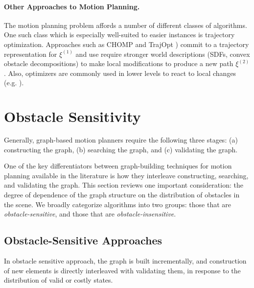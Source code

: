 \paragraph{Other Approaches to Motion Planning.}
The motion planning problem affords a number of different classes of
algorithms.
One such class which is especially well-suited to easier instances
is trajectory optimization.
Approaches such as CHOMP \citep{zucker2013chomp}
and TrajOpt \citep{schulman2013trajopt})
commit to a trajectory representation for $\xi^{(1)}$
and use require stronger world descriptions
(SDFs, convex obstacle decompositions)
to make local modifications
to produce a new path $\xi^{(2)}$.
Also,
optimizers are commonly used in lower levels to react to local
changes (e.g. \citep{quinlan1994modification}).

\section{Obstacle Sensitivity}
\label{sec:roadmaps:sensitivity}

Generally,
graph-based motion planners require the following three stages:
(a) constructing the graph,
(b) searching the graph, and
(c) validating the graph.

One of the key differentiators between graph-building techniques
for motion planning available in the literature
is how they interleave constructing, searching, and validating
the graph.
This section reviews one important consideration:
the degree of dependence of the graph structure
on the distribution of obstacles in the scene.
We broadly categorize algorithms into two groups:
those that are \emph{obstacle-sensitive},
and those that are \emph{obstacle-insensitive}.

\subsection{Obstacle-Sensitive Approaches}
\label{subsec:roadmaps:sensitive}

In obstacle sensitive approach,
the graph is built incrementally,
and construction of new elements
is directly interleaved with validating them,
in response to the distribution of valid or costly states.

